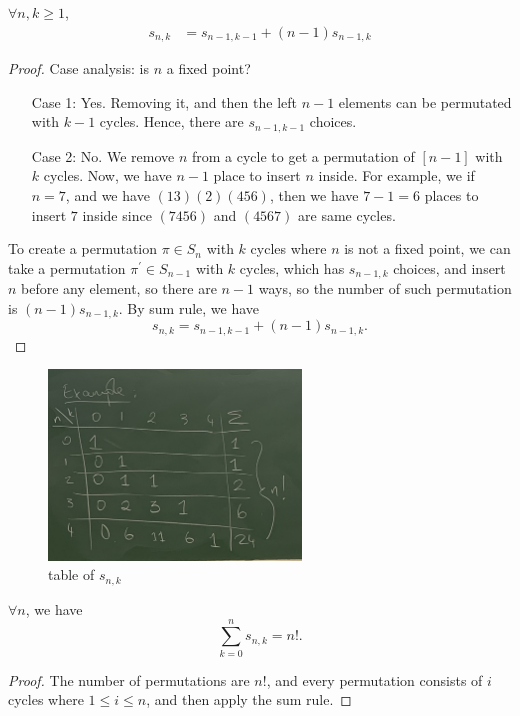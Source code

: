\begin{proposition}
    \(\forall n, k \ge 1\), 
    \begin{align*}
        s_{n,k} &= s_{n-1, k-1} + (n-1)s_{n-1,k}
    \end{align*} 
\end{proposition}
\begin{proof}
    Case analysis: is \(n\) a fixed point? 
    \begin{itemize}
        \item [Case 1:] Yes. Removing it, and then the left \(n-1\) elements can be permutated with \(k-1\) cycles. Hence, there are \(s_{n-1,k-1}\) choices.  
        \item [Case 2:] No. We remove \(n\) from a cycle to get a permutation of \([n-1]\) with \(k\) cycles. Now, we have \(n-1\) place to insert \(n\) inside. For example, we if \(n=7\), and we have \((13)(2)(456)\), then we have \(7-1=6\) places to insert \(7\) inside since \((7456)\) and \((4567)\) are same cycles.         
    \end{itemize} 
    To create a permutation \(\pi \in S_n\) with \(k\) cycles where \(n\) is not a fixed point, we can take a permutation \(\pi ^{\prime}  \in S_{n-1}\) with \(k\) cycles, which has \(s_{n-1, k}\) choices, and insert \(n\) before any element, so there are \(n-1\) ways, so the number of such permutation is \((n-1)s_{n-1,k}\).  By sum rule, we have 
    \[
        s_{n, k} = s_{n-1, k-1} + (n-1)s_{n-1, k}.
    \]
\end{proof}    
\begin{figure}[H]
    \centering
    \includegraphics[width=0.6\textwidth]{./Figures/IMG_3936.jpg}
    \caption{table of \(s_{n,k}\)}
    \label{fig:table of Stirling number of first kind}
\end{figure}

\begin{corollary}
    \(\forall n\), we have 
    \[
        \sum_{k=0}^n s_{n,k} = n!. 
    \] 
\end{corollary}
\begin{proof}
    The number of permutations are \(n!\), and every permutation consists of \(i\) cycles where \(1 \le i \le n\), and then apply the sum rule.   
\end{proof}

